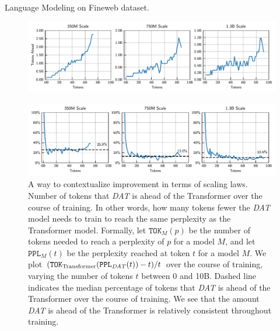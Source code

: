 \begin{table}[h]
    \centering
    \caption{Language Modeling on Fineweb dataset.}\label{tab:fineweb_results}
    
\end{table}

\begin{figure}
    \includegraphics[width=\textwidth]{figs/experiments/fineweb/tokens_ahead.pdf}
\end{figure}

\begin{figure}
    \includegraphics[width=\textwidth]{figs/experiments/fineweb/tokens_ahead_percent.pdf}
    \caption{A way to contextualize improvement in terms of scaling laws. Number of tokens that \textit{DAT} is ahead of the Transformer over the course of training. In other words, how many tokens fewer the \textit{DAT} model needs to train to reach the same perplexity as the Transformer model. Formally, let $\mathtt{TOK}_{M}(p)$ be the number of tokens needed to reach a perplexity of $p$ for a model $M$, and let $\mathtt{PPL}_{M}(t)$ be the perplexity reached at token $t$ for a model $M$. We plot $(\mathtt{TOK}_{\mathrm{Transformer}}(\mathtt{PPL}_{\text{\textit{DAT}}}(t)) - t) / t$ over the course of training, varying the number of tokens $t$ between 0 and 10B. Dashed line indicates the median percentage of tokens that \textit{DAT} is ahead of the Transformer over the course of training. We see that the amount \textit{DAT} is ahead of the Transformer is relatively consistent throughout training.}
\end{figure}

